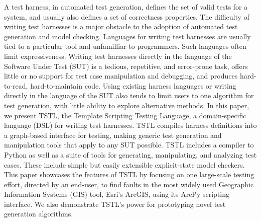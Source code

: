 A test harness, in automated test generation, defines the set of valid
tests for a system, and usually also defines a set of correctness
properties.  The difficulty of writing test harnesses is a major
obstacle to the adoption of automated test generation and model
checking.  Languages for writing test harnesses are usually tied to a
particular tool and unfamilliar to programmers.  Such languages often
limit expressiveness.  Writing test harnesses directly in the language
of the Software Under Test (SUT) is a tedious, repetitive, and
error-prone task, offers little or no support for test case
manipulation and debugging, and produces hard-to-read,
hard-to-maintain code.  Using existing harness languages or writing
directly in the language of the SUT also tends to limit users to one
algorithm for test generation, with little ability to explore
alternative methods.  In this paper, we present TSTL, the Template
Scripting Testing Language, a domain-specific language (DSL) for
writing test harnesses.  TSTL compiles harness definitions into a
graph-based interface for testing, making generic test generation and
manipulation tools that apply to any SUT possible.  TSTL includes a
compiler to Python as well as a suite of tools for generating,
manipulating, and analyzing test cases.  These include simple but
easily extensible explicit-state model checkers.  This paper showcases
the features of TSTL by focusing on one large-scale testing effort,
directed by an end-user, to find faults in the most widely used
Geographic Information Systems (GIS) tool, Esri's ArcGIS, using its
ArcPy scripting interface.  We also demonstrate TSTL's power for
prototyping novel test generation algorithms.




